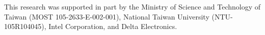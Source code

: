 \begin{acknowledgementsen}
This research was supported in part by the Ministry of Science and Technology of Taiwan (MOST 105-2633-E-002-001), National Taiwan University (NTU-105R104045), Intel Corporation, and Delta Electronics.
\end{acknowledgementsen}

